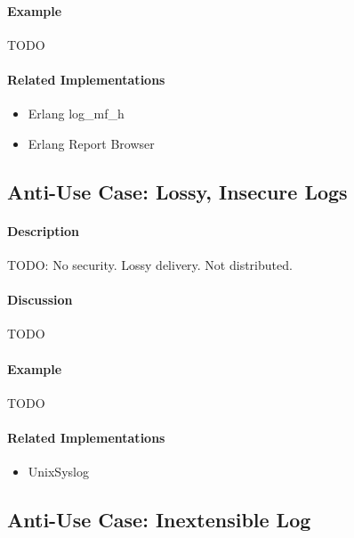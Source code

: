\paragraph{Example}

{\Large TODO}

\paragraph{Related Implementations}

\begin{itemize}
	\item Erlang \textsf{log\_mf\_h}
	\item Erlang Report Browser
\end{itemize}

\subsection{Anti-Use Case: Lossy, Insecure Logs}

\paragraph{Description}

{\Large TODO:} No security.  Lossy delivery.  Not distributed.

\paragraph{Discussion}

{\Large TODO}

\paragraph{Example}

{\Large TODO}

\paragraph{Related Implementations}

\begin{itemize}
	\item Unix\texttrademark Syslog
\end{itemize}

\subsection{Anti-Use Case: Inextensible Log}

